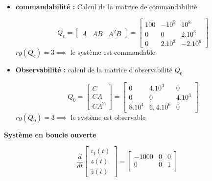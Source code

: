 {{{{\begin{itemize}
\begin{center}
    \end{center} 
    \item \textbf{commandabilité : } Calcul de la matrice de commandabilité \newline
    \begin{center}
        \[
        Q_{c} = 
        \begin{bmatrix}
            A & AB & A^{2}B
        \end{bmatrix}
        =
        \begin{bmatrix}
            100 & -10^{5} & 10^{8} \\
            0   & 0       & 2.10^{3} \\
            0   & 2.10^{3}& -2.10^{6}
        \end{bmatrix}
        \]
        \newline
        $
        rg(Q_{c}) = 3 \implies
        $ le système est commandable
    \end{center}
    \item \textbf{Observabilité : } calcul de la matrice d'observabilité $Q_{0}$
    \begin{center}
        \[
        Q_{0} = 
        \begin{bmatrix}
            C \\
            CA \\
            CA^{2}
        \end{bmatrix}
        =
        \begin{bmatrix}
            0       & 4.10^{3}  & 0 \\
            0       & 0         & 4.10^{3} \\
            8.10^{4}& 6,4.10^{6}& 0
        \end{bmatrix}
        \]
        \newline
        $
        rg(Q_{0}) = 3 \implies
        $ le système est observable
    \end{center}    
\end{itemize}
\textbf{Système en boucle ouverte}
\begin{center}
    \[
    \frac{d}{dt}
    \begin{bmatrix}
    i_{1}(t) \\
    z(t) \\
    \dot{z}(t)    
    \end{bmatrix}
    =
    \begin{bmatrix}
        -1000 & 0    & 0 \\
        0     & 0    & 1 \\

\end{bmatrix}\]
\end{center}}}}}
